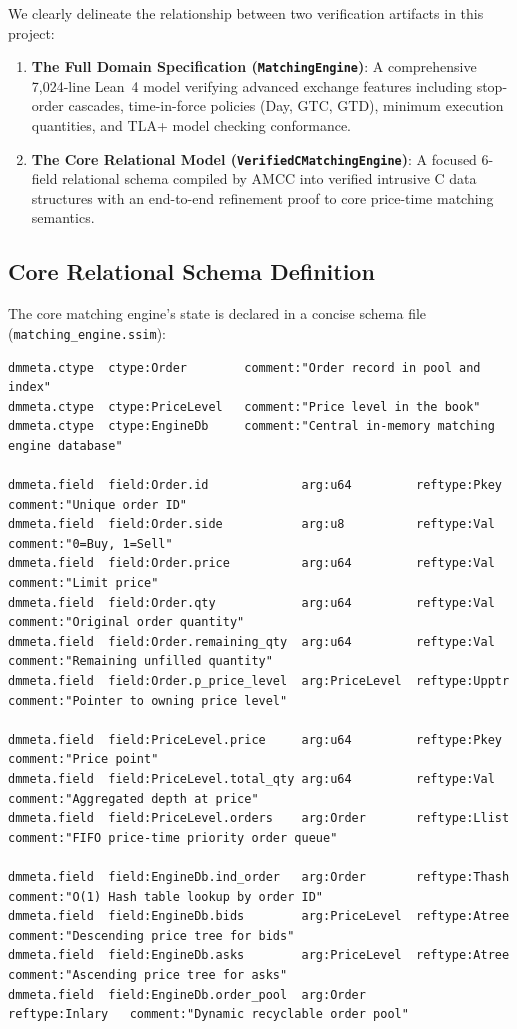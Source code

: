 \documentclass[11pt,a4paper]{article}
\begin{document}
We clearly delineate the relationship between two verification artifacts in this project:
\begin{enumerate}[leftmargin=*]
    \item \textbf{The Full Domain Specification (\texttt{MatchingEngine})}: A comprehensive 7,024-line Lean~4 model verifying advanced exchange features including stop-order cascades, time-in-force policies (Day, GTC, GTD), minimum execution quantities, and TLA+ model checking conformance.
    \item \textbf{The Core Relational Model (\texttt{VerifiedCMatchingEngine})}: A focused 6-field relational schema compiled by AMCC into verified intrusive C data structures with an end-to-end refinement proof to core price-time matching semantics.
\end{enumerate}

\subsection{Core Relational Schema Definition}

The core matching engine's state is declared in a concise schema file (\texttt{matching\_engine.ssim}):

\begin{lstlisting}[language={}]
dmmeta.ctype  ctype:Order        comment:"Order record in pool and index"
dmmeta.ctype  ctype:PriceLevel   comment:"Price level in the book"
dmmeta.ctype  ctype:EngineDb     comment:"Central in-memory matching engine database"

dmmeta.field  field:Order.id             arg:u64         reftype:Pkey     comment:"Unique order ID"
dmmeta.field  field:Order.side           arg:u8          reftype:Val      comment:"0=Buy, 1=Sell"
dmmeta.field  field:Order.price          arg:u64         reftype:Val      comment:"Limit price"
dmmeta.field  field:Order.qty            arg:u64         reftype:Val      comment:"Original order quantity"
dmmeta.field  field:Order.remaining_qty  arg:u64         reftype:Val      comment:"Remaining unfilled quantity"
dmmeta.field  field:Order.p_price_level  arg:PriceLevel  reftype:Upptr    comment:"Pointer to owning price level"

dmmeta.field  field:PriceLevel.price     arg:u64         reftype:Pkey     comment:"Price point"
dmmeta.field  field:PriceLevel.total_qty arg:u64         reftype:Val      comment:"Aggregated depth at price"
dmmeta.field  field:PriceLevel.orders    arg:Order       reftype:Llist    comment:"FIFO price-time priority order queue"

dmmeta.field  field:EngineDb.ind_order   arg:Order       reftype:Thash    comment:"O(1) Hash table lookup by order ID"
dmmeta.field  field:EngineDb.bids        arg:PriceLevel  reftype:Atree    comment:"Descending price tree for bids"
dmmeta.field  field:EngineDb.asks        arg:PriceLevel  reftype:Atree    comment:"Ascending price tree for asks"
dmmeta.field  field:EngineDb.order_pool  arg:Order       reftype:Inlary   comment:"Dynamic recyclable order pool"
\end{lstlisting}
\end{document}
